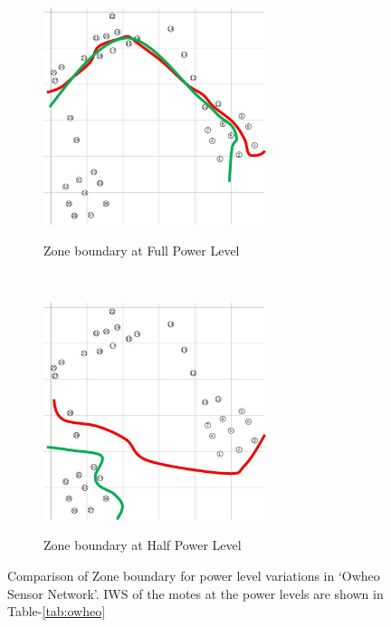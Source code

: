 \documentclass[conference,final]{IEEEtran}
\begin{document}
\begin{figure}[t!]
\label{fig:owheo}
    \centering
    \begin{subfigure}[b]{0.5\textwidth}
        \centering
        \includegraphics[height=2.5in]{Owheo_full}
        \label{subfig:owheo_full}
        \caption{Zone boundary at Full Power Level}
    \end{subfigure}%
    ~ 
    \begin{subfigure}[b]{0.5\textwidth}
        \centering
        \includegraphics[height=2.5in]{Owheo_half}
        \label{subfig:owheo_half}
        \caption{Zone boundary at Half Power Level}
    \end{subfigure}
    \caption{Comparison of Zone boundary for power level variations in `Owheo Sensor Network'. IWS of the motes at the power levels are shown in Table-\ref{tab:owheo}}
\end{figure}
\end{document}
